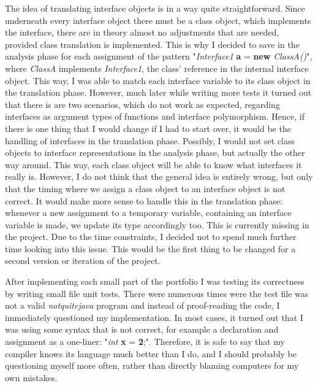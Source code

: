 The idea of translating interface objects is in a way quite straightforward.
Since underneath every interface object there must be a class object,
which implements the interface, there are in theory almost no
adjustments that are needed, provided class translation is implemented.
This is why I decided to save in the analysis phase for each assignment of the pattern 
"\textit{Interface1} \textbf{a} = \textbf{new} \textit{ClassA()}", where \textit{ClassA}
implements \textit{Interface1}, the class' reference in the internal interface object.
This way, I was able to match each
interface variable to its class object in the translation phase.
However, much later while writing more tests it turned out that there
is are two scenarios, which
do not work as expected, regarding interfaces as argument types of functions and
interface polymorphism.
Hence, if there is one thing that I would change if I had to start over, it would
be the handling of interfaces in the translation phase.
Possibly, I would not set class objects to interface representations in the analysis
phase, but actually the other way around. This way, each class object
will be able to know what interfaces it really is. However,
I do not think that the general idea is entirely wrong, but only that
the timing where we assign a class object to an interface object is not correct.
It would make more sense to handle this in the translation phase: whenever
a new assignment to a temporary variable, containing an interface variable is made, 
we update its type accordingly too.
This is currently missing in the project.
Due to the time constraints, I decided not to spend much further time looking into this issue.
This would be the first thing to be changed for a second version or iteration of the project.

After implementing each small part of the portfolio I was testing
its correctness by writing small file unit tests.
There were numerous times were the test file was not a valid
\textit{notquitejava} program and instead of proof-reading the code,
I immediately questioned my implementation.
In most cases, it turned out that I was using some syntax that is not
correct, for example a declaration and assignment as a one-liner:
"\textit{int} \textbf{x} = \textbf{2};".
Therefore, it is safe to say that my compiler knows its language much
better than I do, and I should probably be questioning myself more often, rather than
directly blaming computers for my own mistakes.

